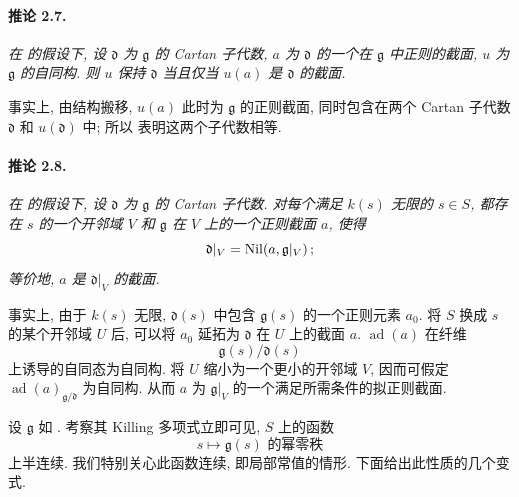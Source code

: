 \paragraph{\textbf{推论 2.7.}}
\emph{在  的假设下, 设 \(\mathfrak d\) 为 \(\mathfrak g\) 的 Cartan 子代数, \(a\) 为 \(\mathfrak d\) 的一个在 \(\mathfrak g\) 中正则的截面, \(u\) 为 \(\mathfrak g\) 的自同构. 则 \(u\) 保持 \(\mathfrak d\) 当且仅当 \(u(a)\) 是 \(\mathfrak d\) 的截面.}

事实上, 由结构搬移, \(u(a)\) 此时为 \(\mathfrak g\) 的正则截面, 同时包含在两个 Cartan 子代数 \(\mathfrak d\) 和 \(u(\mathfrak d)\) 中; 所以 表明这两个子代数相等.



\paragraph{\textbf{推论 2.8.}}
\emph{在  的假设下, 设 \(\mathfrak d\) 为 \(\mathfrak g\) 的 Cartan 子代数. 对每个满足 \(k(s)\) 无限的 \(s\in S\), 都存在 \(s\) 的一个开邻域 \(V\) 和 \(\mathfrak g\) 在 \(V\) 上的一个正则截面 \(a\), 使得
\[
  \mathfrak d|_V=\operatorname{Nil}\!\left(a,\mathfrak g|_V\right);
\]
等价地, \(a\) 是 \(\mathfrak d|_V\) 的截面.}

事实上, 由于 \(k(s)\) 无限, \(\mathfrak d(s)\) 中包含 \(\mathfrak g(s)\) 的一个正则元素 \(a_0\). 将 \(S\) 换成 \(s\) 的某个开邻域 \(U\) 后, 可以将 \(a_0\) 延拓为 \(\mathfrak d\) 在 \(U\) 上的截面 \(a\). \(\operatorname{ad}(a)\) 在纤维
\[
  \mathfrak g(s)/\mathfrak d(s)
\]
上诱导的自同态为自同构. 将 \(U\) 缩小为一个更小的开邻域 \(V\), 因而可假定 \(\operatorname{ad}(a)_{\mathfrak g/\mathfrak d}\) 为自同构. 从而 \(a\) 为 \(\mathfrak g|_V\) 的一个满足所需条件的拟正则截面.

设 \(\mathfrak g\) 如 . 考察其 Killing 多项式立即可见, \(S\) 上的函数
\[
  s\longmapsto\mathfrak g(s)\text{ 的幂零秩}
\]
上半连续. 我们特别关心此函数连续, 即局部常值的情形. 下面给出此性质的几个变式.


